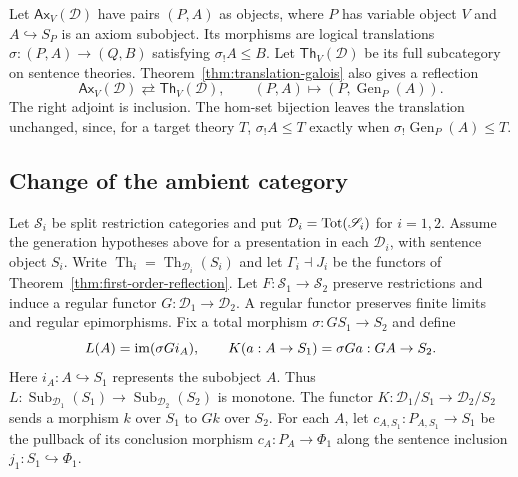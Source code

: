 Let $\mathsf{Ax}_V(\mathcal D)$ have pairs $(P,A)$ as objects,
where $P$ has variable object $V$ and $A\hookrightarrow S_P$ is an
axiom subobject. Its morphisms are logical translations
$\sigma:(P,A)\to(Q,B)$ satisfying $\sigma_!A\leq B$.
Let $\mathsf{Th}_V(\mathcal D)$ be its full subcategory on sentence
theories. Theorem~\ref{thm:translation-galois} also gives a
reflection
\[
 \mathsf{Ax}_V(\mathcal D)\rightleftarrows
 \mathsf{Th}_V(\mathcal D),\qquad
 (P,A)\longmapsto(P,\operatorname{Gen}_P(A)).
\]
The right adjoint is inclusion. The hom-set bijection leaves the
translation unchanged, since, for a target theory $T$,
$\sigma_!A\leq T$ exactly when
$\sigma_!\operatorname{Gen}_P(A)\leq T$.

\subsection{Change of the ambient category}
\label{sec:deduction-change-of-base}

Let $\mathscr S_i$ be split restriction categories and put
$\mathcal D_i=\operatorname{Tot}(\mathscr S_i)$ for $i=1,2$. Assume the
generation hypotheses above for a presentation in each
$\mathcal D_i$, with sentence object $S_i$. Write
$\operatorname{Th}_i=\operatorname{Th}_{\mathcal D_i}(S_i)$ and
let $\Gamma_i\dashv J_i$ be the functors of
Theorem~\ref{thm:first-order-reflection}. Let
$F:\mathscr S_1\to\mathscr S_2$ preserve restrictions and induce
a regular functor $G:\mathcal D_1\to\mathcal D_2$. A regular
functor preserves finite limits and regular epimorphisms. Fix a
total morphism $\sigma:GS_1\to S_2$ and define
\[
 L(A)=\operatorname{im}(\sigma G i_A),\qquad
 K(a:A\to S_1)=\sigma Ga:GA\to S_2.
\]
Here $i_A:A\hookrightarrow S_1$ represents the subobject $A$.
Thus $L:\operatorname{Sub}_{\mathcal D_1}(S_1)\to
\operatorname{Sub}_{\mathcal D_2}(S_2)$ is monotone. The functor
$K:\mathcal D_1/S_1\to\mathcal D_2/S_2$ sends a morphism $k$ over $S_1$
to $Gk$ over $S_2$.
For each $A$, let $c_{A,S_1}:P_{A,S_1}\to S_1$ be the pullback
of its conclusion morphism $c_A:P_A\to\Phi_1$ along the sentence
inclusion $j_1:S_1\hookrightarrow\Phi_1$.

